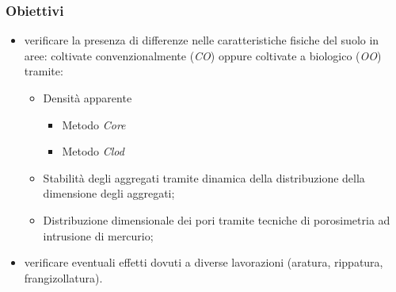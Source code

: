 
\subtitle{\textbf{Uno
    studio di fisica del suolo}}


\begin{frame}%
  \titlepage 
\end{frame}





\begin{frame}
  \frametitle{Obiettivi}
  \large
  \begin{itemize}[<+->]
  \item verificare la presenza di differenze nelle caratteristiche
    fisiche del suolo in aree: coltivate convenzionalmente (\emph{CO})
    oppure coltivate a biologico (\emph{OO}) tramite:
    \begin{itemize}
    \item Densit\`a apparente
      \begin{itemize}
      \item Metodo \emph{Core}
      \item Metodo \emph{Clod}
      \end{itemize}
    \item Stabilit\`a degli aggregati tramite dinamica della
      distribuzione della dimensione degli aggregati;
    \item Distribuzione dimensionale dei pori tramite tecniche di
      porosimetria ad intrusione di mercurio;      
    \end{itemize}
  \item verificare eventuali effetti dovuti a diverse lavorazioni
    (aratura, rippatura, frangizollatura).
  \end{itemize}
\end{frame}

